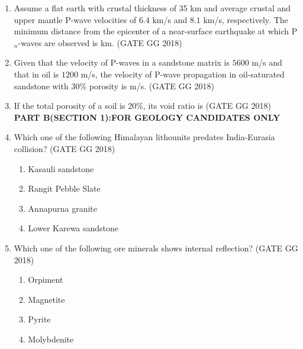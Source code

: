 \documentclass[journal]{IEEEtran}
\begin{document}
\begin{enumerate}[start=1]
\item Assume a flat earth with crustal thickness of 35 km and average crustal and upper mantle P-wave velocities of $6.4$ km/s and $8.1$ km/s, respectively. The minimum distance from the epicenter of a near-surface earthquake at which P$_n$-waves are observed is  \makebox[2cm]{\hrulefill} km.
\hfill(GATE GG 2018)
\vspace{0.7cm}
\item Given that the velocity of P-waves in a sandstone matrix is $5600$ m/s and that in oil is $1200$ m/s, the velocity of P-wave propagation in oil-saturated sandstone with $30$\% porosity is \makebox[2cm]{\hrulefill} m/s. 
\hspace*{15.7cm}(GATE GG 2018)
\vspace{1cm}

  \item If the total porosity of a soil is $20$\%, its void ratio \brak{\%} is \makebox[2cm]{\hrulefill}
  \hfill(GATE GG 2018)\\

\textbf{PART B(SECTION 1):FOR GEOLOGY CANDIDATES ONLY}
\vspace{0.7cm}
  \item Which one of the following Himalayan lithounits predates India-Eurasia collision?  
  \hfill(GATE GG 2018)
\begin{multicols}{2}
\begin{enumerate}
\item Kasauli sandstone
\item Rangit Pebble Slate
\item Annapurna granite
\item Lower Karewa sandstone
\end{enumerate}
\end{multicols}

\item Which one of the following ore minerals shows internal reflection? 
\hfill(GATE GG 2018)
\begin{multicols}{4}
\begin{enumerate}
\item Orpiment
\item Magnetite
\item Pyrite
\item Molybdenite
\end{enumerate}
\end{multicols}


\end{enumerate}
\end{document}
